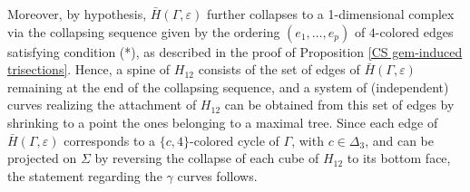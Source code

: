 \documentclass[12pt,a4paper]{article}
\newcommand{\qed}{\\ \rightline{$\Box$ \ \ \ \ \ \ \ \ \ \ \ \ \ \ \ }\\}
\newcommand{\e}{\varepsilon}
\newcommand{\G}{\Gamma}
\begin{document}
Moreover, by hypothesis, $\bar H(\G, \e)$ further collapses to a 1-dimensional complex via the collapsing sequence given by the ordering $(e_1, \dots, e_p)$ of $4$-colored edges satisfying condition (*), as described in the proof of Proposition \ref{CS gem-induced trisections}.  
Hence, a spine of $H_{12}$ consists of the set of edges of $\bar H(\G, \e)$ remaining at the end of the collapsing sequence, and a system of (independent) curves realizing the  attachment  of $H_{12}$ can  be obtained from this set of edges by shrinking to a point the ones belonging to a maximal tree.   
Since each edge of $\bar H(\G, \e)$ corresponds to a $\{c,4\}$-colored cycle of $\Gamma$, with $c \in \Delta_3$, and can be projected on $\Sigma$ by reversing the collapse of each cube of $H_{12}$ to its bottom face, the statement regarding the $\gamma$ curves follows. 

\ \qed

\medskip
\end{document}
